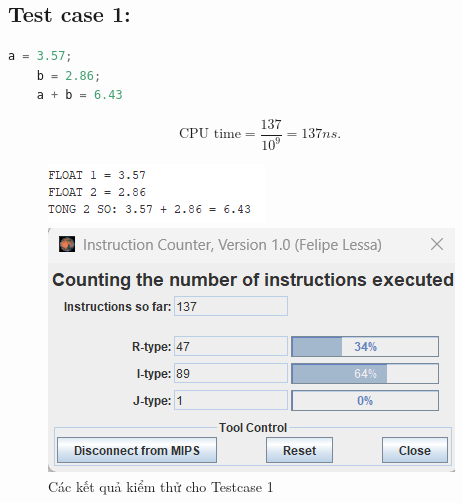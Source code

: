 \subsection{Test case 1:}
\begin{lstlisting}[language=Python]
    a = 3.57;
    b = 2.86;
    a + b = 6.43
\end{lstlisting}
\[
\text{CPU time} = \frac{\text{137}}{10^9} = 137 ns.
\]

\begin{figure}[!h]
    \centering
    \begin{minipage}[b]{0.48\textwidth}
        \centering
        \includegraphics[width=\textwidth]{image/TESTCASE/Testcase 1.png}
    \end{minipage}
    \hfill
    \begin{minipage}[b]{0.48\textwidth}
        \centering
        \includegraphics[width=\textwidth]{image/TESTCASE/Instruction Counter 1.png}
    \end{minipage}
    \vspace{0.5cm}
    \caption{Các kết quả kiểm thử cho Testcase 1}
\end{figure}

\vspace{0.5cm}


